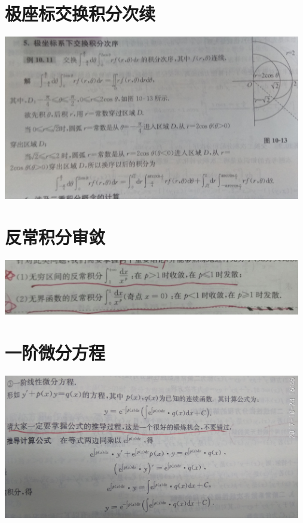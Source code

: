 \documentclass[UTF8]{ctexart}
\begin{document}
\section{极座标交换积分次续}
\includegraphics[width=13cm]{9345E7/3720754172.jpg}
\section{反常积分审敛}
\includegraphics[width=13cm]{9345E7/2059466188.jpg}

\section{一阶微分方程}
\includegraphics[width=13cm]{9345E7/677562795.jpg}
\end{document}
